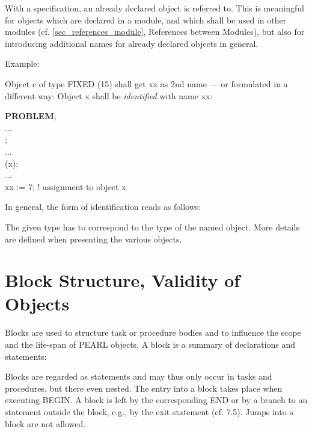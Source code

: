 With a specification, an already declared object is
referred to.  This is meaningful for objects which are declared in a
module, and which shall be used in other modules (cf. \ref{sec_references_module},
 References
between Modules), but also for introducing additional names for already
declared objects in general.
\newpage

Example:

Object c of type FIXED (15) shall get xx as 2nd name --- or formulated
in a different way: Object x shall be {\it identified} with name xx:

{\bf PROBLEM};\\
\x ...\\
;\\
\x ...\\
 (x);\\
\x ...\\
\x xx := 7; \x ! assignment to object x

In general, the form of identification reads as follows:






The given type has to correspond to the type of the named object. More
details are defined when presenting the various objects.

\section{Block Structure, Validity of Objects}   %
\label{sec_block}

Blocks are used to structure task or procedure bodies and to influence
the scope and the life-span of PEARL objects. A block is a summary of
declarations and statements:



Blocks are regarded as statements and may thus only occur in tasks and
procedures, but there even nested. The entry into a block takes
place when executing BEGIN. A block is left by the corresponding END or
by a branch to an statement outside the block, e.g., by the exit
statement (cf. 7.5). Jumps into a block are not allowed.

